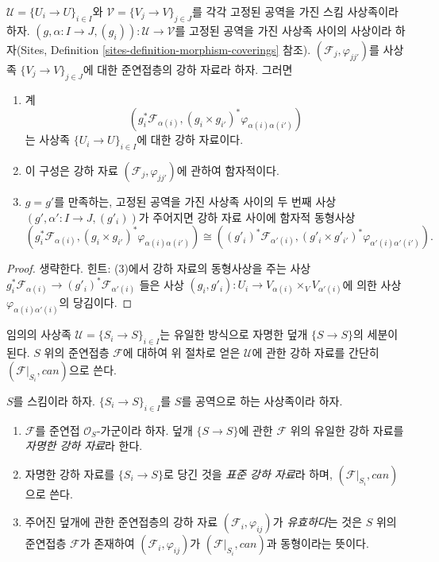 \begin{lemma}
\label{lemma-refine-descent-datum}
$\mathcal{U} = \{U_i \to U\}_{i \in I}$와
$\mathcal{V} = \{V_j \to V\}_{j \in J}$를 각각 고정된 공역을 가진
스킴 사상족이라 하자.
$(g, \alpha : I \to J, (g_i)) : \mathcal{U} \to \mathcal{V}$를 고정된
공역을 가진 사상족 사이의 사상이라 하자(Sites, Definition
\ref{sites-definition-morphism-coverings} 참조).
$(\mathcal{F}_j, \varphi_{jj'})$를 사상족
$\{V_j \to V\}_{j \in J}$에 대한 준연접층의 강하 자료라 하자. 그러면
\begin{enumerate}
\item 계
$$
\left(g_i^*\mathcal{F}_{\alpha(i)},
(g_i \times g_{i'})^*\varphi_{\alpha(i)\alpha(i')}\right)
$$
는 사상족 $\{U_i \to U\}_{i \in I}$에 대한 강하 자료이다.
\item 이 구성은 강하 자료 $(\mathcal{F}_j, \varphi_{jj'})$에 관하여
함자적이다.
\item $g = g'$를 만족하는, 고정된 공역을 가진 사상족 사이의 두 번째 사상
$(g', \alpha' : I \to J, (g'_i))$가 주어지면 강하 자료 사이에 함자적 동형사상
$$
(g_i^*\mathcal{F}_{\alpha(i)},
(g_i \times g_{i'})^*\varphi_{\alpha(i)\alpha(i')})
\cong
((g'_i)^*\mathcal{F}_{\alpha'(i)},
(g'_i \times g'_{i'})^*\varphi_{\alpha'(i)\alpha'(i')}).
$$
\end{enumerate}
\end{lemma}

\begin{proof}
생략한다. 힌트: (3)에서 강하 자료의 동형사상을 주는 사상
$g_i^*\mathcal{F}_{\alpha(i)} \to (g'_i)^*\mathcal{F}_{\alpha'(i)}$
들은 사상 $(g_i, g'_i) : U_i \to V_{\alpha(i)} \times_V V_{\alpha'(i)}$에
의한 사상 $\varphi_{\alpha(i)\alpha'(i)}$의 당김이다.
\end{proof}

\noindent
임의의 사상족 $\mathcal{U} = \{S_i \to S\}_{i \in I}$는 유일한 방식으로
자명한 덮개 $\{S \to S\}$의 세분이 된다. $S$ 위의 준연접층
$\mathcal{F}$에 대하여 위 절차로 얻은 $\mathcal{U}$에 관한 강하 자료를
간단히 $(\mathcal{F}|_{S_i}, can)$으로 쓴다.

\begin{definition}
\label{definition-descent-datum-effective-quasi-coherent}
$S$를 스킴이라 하자.
$\{S_i \to S\}_{i \in I}$를 $S$를 공역으로 하는 사상족이라 하자.
\begin{enumerate}
\item $\mathcal{F}$를 준연접 $\mathcal{O}_S$-가군이라 하자.
덮개 $\{S \to S\}$에 관한 $\mathcal{F}$ 위의 유일한 강하 자료를
{\it 자명한 강하 자료}라 한다.
\item 자명한 강하 자료를 $\{S_i \to S\}$로 당긴 것을
{\it 표준 강하 자료}라 하며, $(\mathcal{F}|_{S_i}, can)$으로 쓴다.
\item 주어진 덮개에 관한 준연접층의 강하 자료
$(\mathcal{F}_i, \varphi_{ij})$가 {\it 유효하다}는 것은 $S$ 위의 준연접층
$\mathcal{F}$가 존재하여 $(\mathcal{F}_i, \varphi_{ij})$가
$(\mathcal{F}|_{S_i}, can)$과 동형이라는 뜻이다.
\end{enumerate}
\end{definition}

